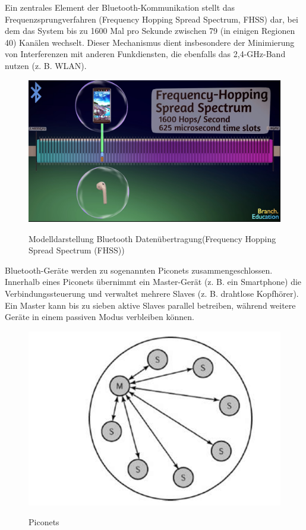 \documentclass[a4paper, 12pt]{article} %
\begin{document}
\begin{spacing}{1.8}  %
\fontsize{14pt}{15pt}\selectfont  %
Ein zentrales Element der Bluetooth-Kommunikation stellt das Frequenzsprungverfahren (Frequency Hopping Spread Spectrum, FHSS) dar, bei dem das System bis zu 1600 Mal pro Sekunde zwischen 79 (in einigen Regionen 40) Kanälen wechselt.
 Dieser Mechanismus dient insbesondere der Minimierung von Interferenzen mit anderen Funkdiensten, die ebenfalls das 2,4-GHz-Band nutzen (z. B. WLAN).

 \begin{figure}[H]
    \includegraphics[width=1\linewidth]{images/2025-01-13_15h05_23.png}\\[1ex]
    \centering
    \caption{Modelldarstellung Bluetooth Datenübertragung(Frequency Hopping Spread Spectrum (FHSS)) \cite{branch_education_lidar_2023}}
    \label{ABBILDUNG 76}
\end{figure}

Bluetooth-Geräte werden zu sogenannten Piconets zusammengeschlossen.
 Innerhalb eines Piconets übernimmt ein Master-Gerät (z. B. ein Smartphone) die Verbindungssteuerung und verwaltet mehrere Slaves (z. B. drahtlose Kopfhörer). 
 Ein Master kann bis zu sieben aktive Slaves parallel betreiben, während weitere Geräte in einem passiven Modus verbleiben können.

 \begin{figure}[H]
    \includegraphics[width=1\linewidth]{images/Piconet.png}\\[1ex]
    \centering
    \caption{Piconets \cite{wikipedia_piconet}}
    \label{ABBILDUNG 76}
\end{figure}


\end{spacing}
\end{document}
